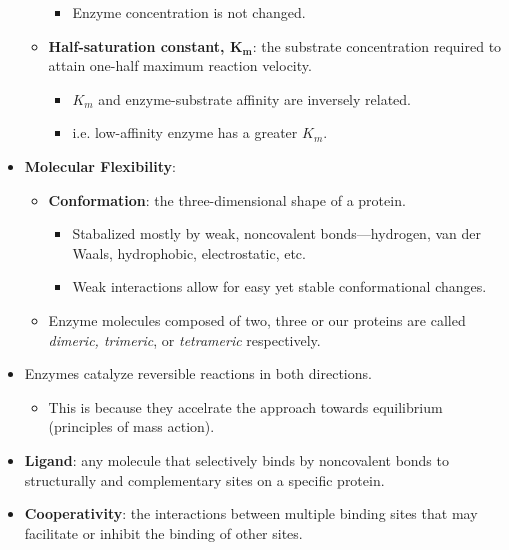 \documentclass[12pt,a4paper]{article}
\begin{document}
\begin{itemize}
\begin{itemize}
\begin{itemize}
                    \item Enzyme concentration is not changed.
                \end{itemize}
            \item \textbf{Half-saturation constant, \(\mathbf{K_m}\)}: the substrate concentration required to attain one-half maximum reaction velocity.
                \begin{itemize}
                    \item \(K_m\) and enzyme-substrate affinity are  {\color{o-Sun}inversely related}.
                    \item i.e. {\color{neg}low-affinity} enzyme has a {\color{pos}greater \(K_{m}\)}.
                \end{itemize}
        \end{itemize}
    \item \textbf{Molecular Flexibility}:
        \begin{itemize}
            \item \textbf{Conformation}: the three-dimensional shape of a protein.
                \begin{itemize}
                    \item Stabalized mostly by {\color{o-Sun}weak, noncovalent bonds}---hydrogen, van der Waals, hydrophobic, electrostatic, etc.
                    \item Weak interactions allow for easy yet stable conformational changes.
                \end{itemize}
            \item Enzyme molecules composed of two, three or our proteins are called \textit{dimeric, trimeric}, or \textit{tetrameric} respectively.
        \end{itemize}
    \item Enzymes catalyze reversible reactions in both directions.
        \begin{itemize}
            \item This is because they accelrate the approach towards equilibrium (principles of mass action).
        \end{itemize}
    \item \textbf{Ligand}: any molecule that selectively binds by noncovalent bonds to structurally and complementary sites on a specific protein.
    \item \textbf{Cooperativity}: the interactions between multiple binding sites that may facilitate or inhibit the binding of other sites.
        \begin{itemize}

\end{itemize}
\end{itemize}
\end{document}
